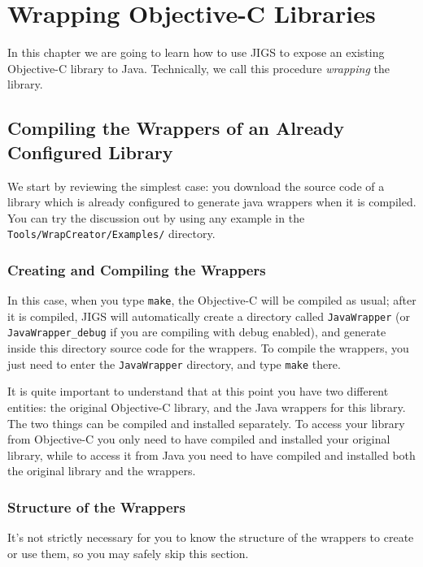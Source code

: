 \chapter{Wrapping Objective-C Libraries}

In this chapter we are going to learn how to use JIGS to expose an
existing Objective-C library to Java.  Technically, we call this
procedure {\sl wrapping} the library.  

\section{Compiling the Wrappers of an Already Configured Library}
We start by reviewing the simplest case: you download the source code
of a library which is already configured to generate java wrappers
when it is compiled.  You can try the discussion out by using any
example in the \texttt{Tools/WrapCreator/Examples/} directory.

\subsection{Creating and Compiling the Wrappers}

In this case, when you type \texttt{make}, the Objective-C will be
compiled as usual; after it is compiled, JIGS will automatically
create a directory called \texttt{JavaWrapper} (or
\texttt{JavaWrapper\_debug} if you are compiling with debug enabled),
and generate inside this directory source code for the wrappers.  To
compile the wrappers, you just need to enter the \texttt{JavaWrapper}
directory, and type \texttt{make} there.

It is quite important to understand that at this point you have two
different entities: the original Objective-C library, and the Java
wrappers for this library.  The two things can be compiled and
installed separately.  To access your library from Objective-C you
only need to have compiled and installed your original library, while
to access it from Java you need to have compiled and installed both
the original library and the wrappers.

\subsection{Structure of the Wrappers}\label{wrapper-structure}

It's not strictly necessary for you to know the structure of the
wrappers to create or use them, so you may safely skip this section.


